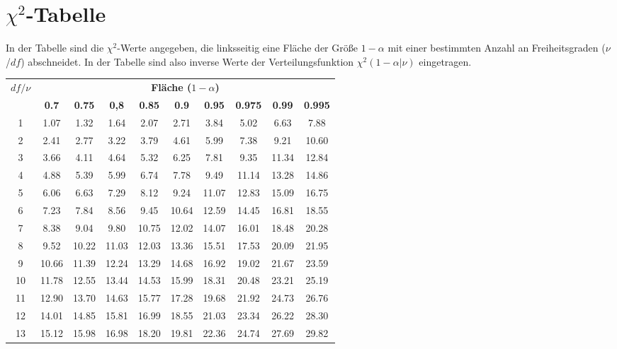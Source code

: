 \documentclass[11pt,a4paper]{article}
\begin{document}
\section{\texorpdfstring{$\chi^2$}{Chi-Quadrat}-Tabelle}
In der Tabelle sind die $\chi^2$-Werte angegeben, die linksseitig eine Fläche der Größe $1- \alpha$ mit einer bestimmten Anzahl an Freiheitsgraden ($\nu$/$df$) abschneidet. In der Tabelle sind also inverse Werte der Verteilungsfunktion $\chi^2(1-\alpha|\nu)$ eingetragen.
\begin{table}[h]
	\centering
	\begin{tabular}{|c||c|c|c|c|c|c|c|c|c|}
		\hline
		\multirow{2}{*}{\textbf{$df / \nu$}} & \multicolumn{9}{c|}{\textbf{Fläche ($1-\alpha$)}} \\ \cline{2-10}
 			& \textbf{0.7} & \textbf{0.75} & \textbf{0,8} & \textbf{0.85} & \textbf{0.9} & \textbf{0.95} & \textbf{0.975} & \textbf{0.99} & \textbf{0.995} \\
		\hline
		\hline
		1 & 1.07 & 1.32 & 1.64 & 2.07 & 2.71 & 3.84 & 5.02 & 6.63 & 7.88\\
		\hline
		2 & 2.41 & 2.77 & 3.22 & 3.79 & 4.61 & 5.99 & 7.38 & 9.21 & 10.60\\
		\hline		
		3 & 3.66 & 4.11 & 4.64 & 5.32 & 6.25 & 7.81 & 9.35 & 11.34 & 12.84\\
		\hline		
		4 & 4.88 & 5.39 & 5.99 & 6.74 & 7.78 & 9.49 & 11.14 & 13.28 & 14.86\\
		\hline		
		5 & 6.06 & 6.63 & 7.29 & 8.12 & 9.24 & 11.07 & 12.83 & 15.09 & 16.75\\
		\hline		
		6 & 7.23 & 7.84 & 8.56 & 9.45 & 10.64 & 12.59 & 14.45 & 16.81 & 18.55\\
		\hline		
		7 & 8.38 & 9.04 & 9.80 & 10.75 & 12.02 & 14.07 & 16.01 & 18.48 & 20.28\\ 
		\hline		
		8 & 9.52 & 10.22 & 11.03 & 12.03 & 13.36 & 15.51 & 17.53 & 20.09 & 21.95\\
		\hline		
		9 & 10.66 & 11.39 & 12.24 & 13.29 & 14.68 & 16.92 & 19.02 & 21.67 & 23.59\\
		\hline		
		10 & 11.78 & 12.55 & 13.44 & 14.53 & 15.99 & 18.31 & 20.48 & 23.21 & 25.19\\
		\hline		
		11 & 12.90 & 13.70 & 14.63 & 15.77 & 17.28 & 19.68 & 21.92 & 24.73 & 26.76\\
		\hline		
		12 & 14.01 & 14.85 & 15.81 & 16.99 & 18.55 & 21.03 & 23.34 & 26.22 & 28.30\\
		\hline		
		13 & 15.12 & 15.98 & 16.98 & 18.20 & 19.81 & 22.36 & 24.74 & 27.69 & 29.82\\

\end{tabular}
\end{table}
\end{document}

